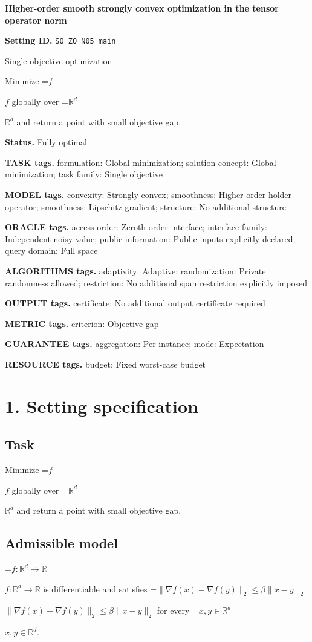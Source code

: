 \documentclass[10pt,a4paper]{article}
\newcommand{\AtlasMath}[1]{\par\begingroup\centering\setbox0=\hbox{$\displaystyle #1$}\ifdim\wd0>1.4\linewidth\typeout{ATLAS WIDE FORMULA: \the\wd0}\fi\ifdim\wd0>\linewidth\resizebox{\linewidth}{!}{\box0}\else\box0\fi\par\endgroup}
\newcommand{\AtlasInlineMath}[1]{\begingroup\setbox0=\hbox{$#1$}\ifdim\wd0>.4\linewidth\endgroup\AtlasMath{#1}\else\endgroup$#1$\fi}
\begin{document}
\raggedright

{\LARGE\bfseries\sffamily\color{AtlasNavy} Higher-order smooth strongly convex optimization in the tensor operator norm\par}\vspace{5pt}
\textbf{Setting ID.} \texttt{SO\_\allowbreak{}ZO\_\allowbreak{}N05\_\allowbreak{}main}

Single-objective optimization

Minimize \AtlasInlineMath{f} globally over \AtlasInlineMath{\mathbb{R}^d} and return a point with small objective gap.

\textbf{Status.} Fully optimal

\textbf{TASK tags.} formulation: Global minimization; solution concept: Global minimization; task family: Single objective

\textbf{MODEL tags.} convexity: Strongly convex; smoothness: Higher order holder operator; smoothness: Lipschitz gradient; structure: No additional structure

\textbf{ORACLE tags.} access order: Zeroth-order interface; interface family: Independent noisy value; public information: Public inputs explicitly declared; query domain: Full space

\textbf{ALGORITHMS tags.} adaptivity: Adaptive; randomization: Private randomness allowed; restriction: No additional span restriction explicitly imposed

\textbf{OUTPUT tags.} certificate: No additional output certificate required

\textbf{METRIC tags.} criterion: Objective gap

\textbf{GUARANTEE tags.} aggregation: Per instance; mode: Expectation

\textbf{RESOURCE tags.} budget: Fixed worst-case budget

\section{1. Setting specification}
\subsection{Task}
Minimize \AtlasInlineMath{f} globally over \AtlasInlineMath{\mathbb{R}^d} and return a point with small objective gap.

\subsection{Admissible model}
\AtlasInlineMath{f:\mathbb{R}^d\to\mathbb{R}} is differentiable and satisfies \AtlasInlineMath{\|\nabla f(x)-\nabla f(y)\|_2\le\beta\|x-y\|_2} for every \AtlasInlineMath{x,y\in\mathbb{R}^d}.
\end{document}
